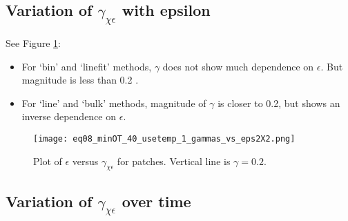 \documentclass[11pt]{article}
\begin{document}
%
%


\clearpage
\subsection{Variation of $\gamma_{\chi\epsilon}$ with epsilon}

See Figure \ref{epsvsgam}:
\begin{itemize}
\item For `bin' and `linefit' methods, $\gamma$ does not show much dependence on $\epsilon$. But magnitude is less than 0.2 .
\item For `line' and `bulk' methods, magnitude of $\gamma$ is closer to 0.2, but shows an inverse dependence on $\epsilon$.
\end{itemize}


\begin{figure}[htbp]
\texttt{[image: eq08\_minOT\_40\_usetemp\_1\_gammas\_vs\_eps2X2.png]}
\caption{Plot of $\epsilon$  versus $\gamma_{\chi\epsilon}$ for patches.  Vertical line is $\gamma=0.2$.}
\label{epsvsgam}
\end{figure}




\clearpage
\subsection{Variation of $\gamma_{\chi\epsilon}$ over time}
\end{document}
